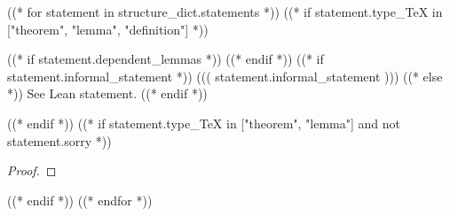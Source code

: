
((* for statement in structure_dict.statements *))
((* if statement.type_TeX in ["theorem", "lemma", "definition"] *))
\begin{((( statement.type_TeX )))}\label{((( statement.name )))}
    \leanok
    ((* if statement.dependent_lemmas *))
    ((* endif *))
    ((* if statement.informal_statement *))
        ((( statement.informal_statement )))
    ((* else *))
        See Lean statement.
    ((* endif *))
\end{((( statement.type_TeX )))}

((* endif *))
((* if statement.type_TeX in ["theorem", "lemma"] and not statement.sorry *))
\begin{proof}
    \leanok
\end{proof}

((* endif *))
((* endfor *))